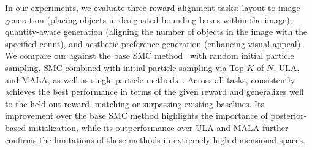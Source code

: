 In our experiments, we evaluate three reward alignment tasks: layout-to-image generation (placing objects in designated bounding boxes within the image), quantity-aware generation (aligning the number of objects in the image with the specified count), and aesthetic-preference generation (enhancing visual appeal). We compare our \methodname{} against the base SMC method~\cite{wu2023tds} with random initial particle sampling, SMC combined with initial particle sampling via Top-$K$-of-$N$, ULA, and MALA, as well as single-particle methods~\cite{chung2023dps, yu2023freedom}. Across all tasks, \methodname{} consistently achieves the best performance in terms of the given reward and generalizes well to the held-out reward, matching or surpassing existing baselines. Its improvement over the base SMC method highlights the importance of posterior-based initialization, while its outperformance over ULA and MALA further confirms the limitations of these methods in extremely high-dimensional spaces.
